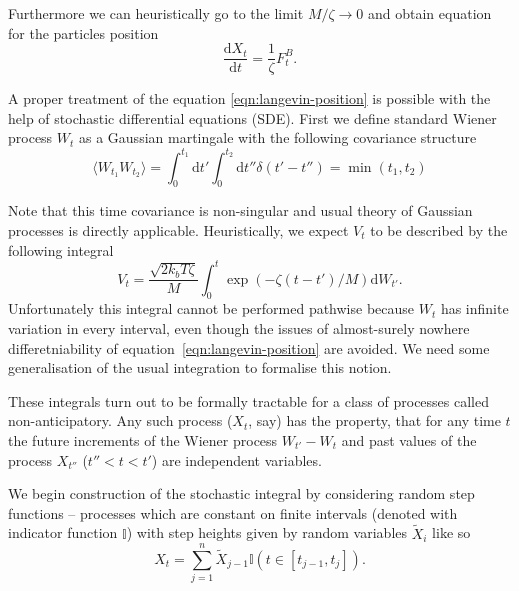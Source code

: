 \documentclass{doctoral}
\newcommand{\dd}{\mathrm{d}}
\begin{document}
Furthermore we can heuristically go to the limit $M/\zeta \to 0$ and obtain equation for the particles position
\begin{equation}
    \frac{\dd X_t}{\dd t} = \frac{1}{\zeta} F_t^B.
    \label{eqn:langevin-position}
\end{equation}

A proper treatment of the equation \eqref{eqn:langevin-position} is possible with the help of stochastic differential equations (SDE).
First we define standard Wiener process $W_t$ as a Gaussian martingale with the following covariance structure
\begin{equation}
    \langle W_{t_1} W_{t_2} \rangle = \int_0^{t_1} \dd t' \int_0^{t_2} \dd t'' \delta(t' - t'') = \min(t_1, t_2) \label{eqn:wiener-process-definition}
\end{equation}

Note that this time covariance is non-singular and usual theory of Gaussian processes is directly applicable.
Heuristically, we expect $V_t$ to be described by the following integral
\begin{equation}
    V_t = \frac{\sqrt{2 k_b T \zeta}}{M} \int_0^t \exp\left( -\zeta(t - t')/M \right) \dd W_{t'}.
    \label{eqn:velocity-integral-sde}
\end{equation}
Unfortunately this integral cannot be performed pathwise because $W_t$ has infinite variation in every interval, even though the issues of almost-surely nowhere differetniability of equation~\eqref{eqn:langevin-position} are avoided.
We need some generalisation of the usual integration to formalise this notion.

These integrals turn out to be formally tractable for a class of processes called non-anticipatory.
Any such process ($X_t$, say) has the property, that for any time $t$ the future increments of the Wiener process $W_{t'} - W_t$ and past values of the process $X_{t''}$ ($t'' < t < t'$) are independent variables.

We begin construction of the stochastic integral by considering random step functions -- processes which are constant on finite intervals (denoted with indicator function $\mathbb{I}$) with step heights given by random variables $\widetilde{X}_{i}$ like so
\begin{equation}
    X_t = \sum_{j=1}^{n} \widetilde{X}_{j-1} \mathbb{I}(t \in [t_{j-1},t_j]).
    \label{eqn:random-step-function}
\end{equation}
\end{document}
